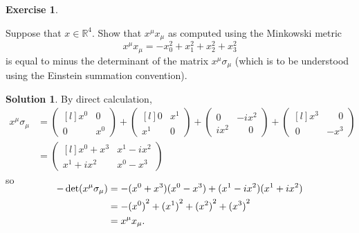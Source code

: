 \documentclass[11pt, a4paper]{report}
\theoremstyle{definition}
\newtheorem{ex}{Exercise}[part]
\newtheorem{sol}{Solution}[part]
\begin{document}
\begin{ex}\label{ex:minkowskispacepaulimatrices}

Suppose that $x \in \mathbb{R}^4$. Show that $x^\mu x_\mu$ as computed using the Minkowski metric
\[
    x^\mu x_\mu = -x_0^2 + x_1^2 + x_2^2 + x_3^2
\]
is equal to minus the determinant of the matrix $x^\mu \sigma_\mu$ (which is to be understood using the Einstein summation convention).

\end{ex}

\begin{sol}

By direct calculation,
\begin{align*}
    x^\mu \sigma_\mu &= \begin{pmatrix*}[l]
                            x^0 & 0 \\
                            0   & x^0
                        \end{pmatrix*}
                        + \begin{pmatrix*}[l]
                            0   & x^1 \\
                            x^1 & 0
                          \end{pmatrix*}
                        + \begin{pmatrix}
                            0     & -i x^2 \\
                            i x^2 &  \phantom{-} 0
                          \end{pmatrix}
                        + \begin{pmatrix*}[l]
                            x^3    & \phantom{-} 0 \\
                            \, 0   & -x^3
                          \end{pmatrix*} \\
        &= \begin{pmatrix*}[l]
            x^0 + x^3 & x^1 - ix^2 \\
            x^1 + ix^2 & x^0 - x^3
          \end{pmatrix*}
\end{align*}
so
\begin{align*}
    \SwapAboveDisplaySkip
    -\det(x^\mu \sigma_\mu) &= - (x^0 + x^3) (x^0 - x^3) + (x^1 - ix^2)(x^1 + ix^2) \\
                            &= - {(x^0)}^2 + {(x^1)}^2 + {(x^2)}^2 + {(x^3)}^2 \\
                            &= x^\mu x_\mu.
\end{align*}

\end{sol}
\end{document}
